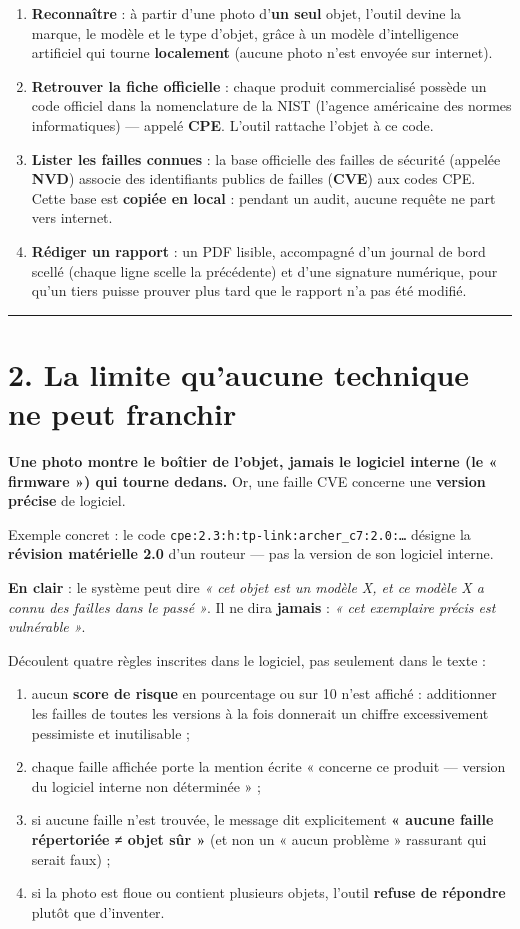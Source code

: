 \documentclass[11pt,a4paper]{article}
\begin{document}
\begin{enumerate}  \item \textbf{Reconnaître} : à partir d'une photo d'\textbf{un seul} objet, l'outil devine la marque, le modèle et le type d'objet, grâce à un modèle d'intelligence artificiel qui tourne \textbf{localement} (aucune photo n'est envoyée sur internet).
  \item \textbf{Retrouver la fiche officielle} : chaque produit commercialisé possède un code officiel dans la nomenclature de la NIST (l'agence américaine des normes informatiques) — appelé \textbf{CPE}. L'outil rattache l'objet à ce code.
  \item \textbf{Lister les failles connues} : la base officielle des failles de sécurité (appelée \textbf{NVD}) associe des identifiants publics de failles (\textbf{CVE}) aux codes CPE. Cette base est \textbf{copiée en local} : pendant un audit, aucune requête ne part vers internet.
  \item \textbf{Rédiger un rapport} : un PDF lisible, accompagné d'un journal de bord scellé (chaque ligne scelle la précédente) et d'une signature numérique, pour qu'un tiers puisse prouver plus tard que le rapport n'a pas été modifié.
\end{enumerate}

\medskip\hrule\medskip
\section*{2. La limite qu'aucune technique ne peut franchir}
\textbf{Une photo montre le boîtier de l'objet, jamais le logiciel interne (le « firmware ») qui tourne dedans.} Or, une faille CVE concerne une \textbf{version précise} de logiciel.

Exemple concret : le code \texttt{cpe:2.3:h:tp-link:archer\_\allowbreak{}c7:2.0:…} désigne la \textbf{révision matérielle 2.0} d'un routeur — pas la version de son logiciel interne.

\textbf{En clair} : le système peut dire \textit{« cet objet est un modèle X, et ce modèle X a connu des failles dans le passé »}. Il ne dira \textbf{jamais} : \textit{« cet exemplaire précis est vulnérable »}.

Découlent quatre règles inscrites dans le logiciel, pas seulement dans le texte :

\begin{enumerate}  \item aucun \textbf{score de risque} en pourcentage ou sur 10 n'est affiché : additionner les failles de toutes les versions à la fois donnerait un chiffre excessivement pessimiste et inutilisable ;
  \item chaque faille affichée porte la mention écrite « concerne ce produit — version du logiciel interne non déterminée » ;
  \item si aucune faille n'est trouvée, le message dit explicitement \textbf{« aucune faille répertoriée ≠ objet sûr »} (et non un « aucun problème » rassurant qui serait faux) ;
  \item si la photo est floue ou contient plusieurs objets, l'outil \textbf{refuse de répondre} plutôt que d'inventer.
\end{enumerate}
\end{document}

